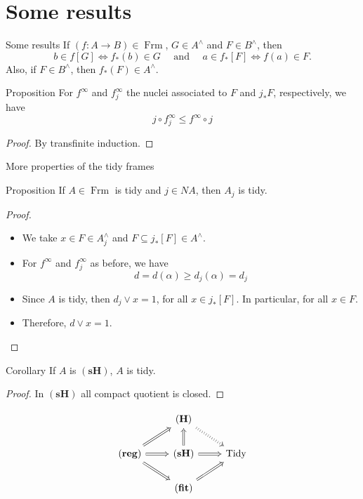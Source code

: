 \documentclass[compress,12pt]{beamer}
\DeclareMathOperator{\Frm}{Frm}
\begin{document}
\section{Some results}

\begin{frame}[fragile]{Some results}
If $(f\colon A\to B)\in \Frm$, $G\in A^\wedge$ and $F\in B^\wedge$, then
\[
b\in f[G]\iff f_*(b)\in G\quad\mbox{ and }\quad a\in f_*[F]\iff f(a)\in F.
\]
Also, if $F\in B^\wedge$, then $f_*(F)\in A^\wedge$.
\begin{block}{Proposition}
For $f^\infty$ and $f_j^\infty$ the nuclei associated to $F$ and $j_*F$, respectively, we have
\[
j\circ f_j^\infty\leq f^\infty \circ j
\]
\end{block}
\begin{proof}
By transfinite induction.
\end{proof}
\end{frame}

\begin{frame}{More properties of the tidy frames}
\begin{block}{Proposition}
If $A\in \Frm$ is tidy and $j\in NA$, then $A_j$ is tidy.
\end{block}
\begin{proof}
\begin{itemize}
\item We take $x\in F\in A_j^\wedge$ and $F\subseteq j_*[F]\in A^\wedge$.
\item For $f^\infty$ and $f_j^\infty$ as before, we have
\[
d=d(\alpha)\geq d_j(\alpha)=d_j
\]
\item Since $A$ is tidy, then $d_j\vee x=1$, for all $x\in j_*[F]$. In particular, for all $x\in F$.
\item Therefore, $d\vee x=1$.
\end{itemize}
\end{proof}

\end{frame}

\begin{frame}[fragile]
\begin{block}{Corollary}
If $A$ is $\mathbf{(sH)}$, $A$ is tidy.
\end{block}
\begin{proof}
In $\mathbf{(sH)}$ all compact quotient is closed.
\end{proof}

\[\begin{tikzcd}
	& {\mathbf{(H)}} \\
	{\mathbf{(reg)}} & {\mathbf{(sH)}} & {\text{Tidy}} \\
	& {\mathbf{(fit)}}
	\arrow[Rightarrow, dotted, from=1-2, to=2-3]
	\arrow[Rightarrow, from=2-1, to=1-2]
	\arrow[Rightarrow, from=2-1, to=2-2]
	\arrow[Rightarrow, from=2-1, to=3-2]
	\arrow[Rightarrow, from=2-2, to=1-2]
	\arrow[Rightarrow, from=2-2, to=2-3]
	\arrow[Rightarrow, from=3-2, to=2-3]
\end{tikzcd}\]
\end{frame}
\end{document}
